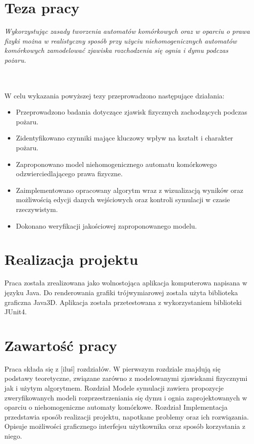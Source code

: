 \section{Teza pracy}
\begin{center}
\textit{ Wykorzystując zasady tworzenia automatów komórkowych oraz w oparciu o prawa fizyki można w realistyczny sposób
przy użyciu niehomogenicznych 
automatów komórkowych
zamodelować zjawiska rozchodzenia się ognia i dymu podczas pożaru.} \end{center} \\ \\

W celu wykazania powyższej tezy przeprowadzono następujące działania:
\begin{itemize}
\item Przeprowadzono badania dotyczące zjawisk fizycznych zachodzących podczas pożaru.
\item Zidentyfikowano czynniki mające kluczowy wpływ na kształt i charakter pożaru.
\item Zaproponowano model niehomogenicznego automatu komórkowego odzwierciedlającego prawa fizyczne.
\item Zaimplementowano opracowany algorytm wraz z wizualizacją wyników oraz możliwością edycji danych wejściowych oraz kontroli symulacji w czasie rzeczywistym.
\item Dokonano weryfikacji jakościowej zaproponowanego modelu.
\end{itemize}

\section {Realizacja projektu} %
Praca została zrealizowana jako wolnostojąca aplikacja komputerowa napisana w języku Java. Do renderowania grafiki trójwymiarowej
została użyta biblioteka graficzna Java3D. Aplikacja została przetestowana z wykorzystaniem biblioteki JUnit4. 

\section{Zawartość pracy} %
Praca składa się z [iluś] rozdziałów. 
W pierwszym rozdziale znajdują się podstawy teoretyczne, związane zarówno z modelowanymi zjawiskami fizycznymi jak i użytym algorytmem.
Rozdział Modele symulacji zawiera propozycje zweryfikowanych modeli rozprzestrzeniania się dymu i ognia zaprojektowanych w oparciu
o niehomogeniczne automaty komórkowe. Rozdział Implementacja przedstawia sposób realizacji projektu, napotkane problemy oraz 
ich rozwiązania. Opisuje możliwości graficznego interfejsu użytkownika oraz sposób korzystania z niego.
